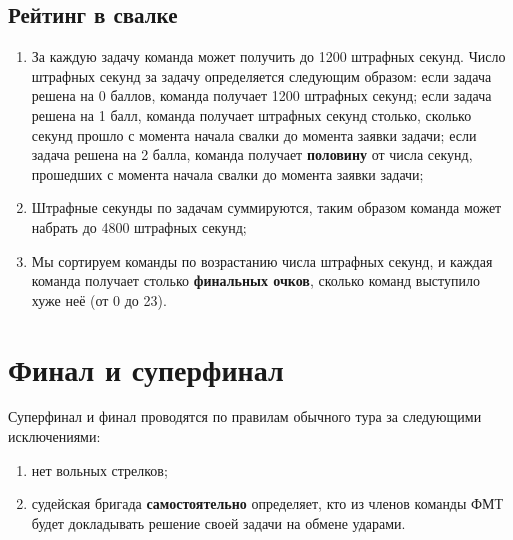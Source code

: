 \documentclass[12pt,a4paper]{article}
\begin{document}
\subsection{Рейтинг в свалке}

\begin{enumerate}
	\item За каждую задачу команда может получить до 1200 штрафных секунд. 
	Число штрафных секунд за задачу определяется следующим образом: если задача решена на 0 баллов, команда получает 1200 штрафных секунд; если задача решена на 1 балл, команда получает штрафных секунд столько, сколько секунд прошло с момента начала свалки до момента заявки задачи; если задача решена на 2 балла, команда получает {\bf половину} от числа секунд, прошедших с момента начала свалки до момента заявки задачи;
	\item Штрафные секунды по задачам суммируются, таким образом команда может набрать до 4800 штрафных секунд;
	\item Мы сортируем команды по возрастанию числа штрафных секунд, и каждая команда получает столько {\bf финальных очков}, сколько команд выступило хуже неё (от 0 до 23).
\end{enumerate}


\section{Финал и суперфинал}
Суперфинал и финал проводятся по правилам обычного тура за следующими исключениями:
\begin{enumerate}
\item нет вольных стрелков;
\item судейская бригада {\bf самостоятельно} определяет, кто из членов команды ФМТ будет докладывать решение своей задачи на обмене ударами.

\end{enumerate}
\end{document}
